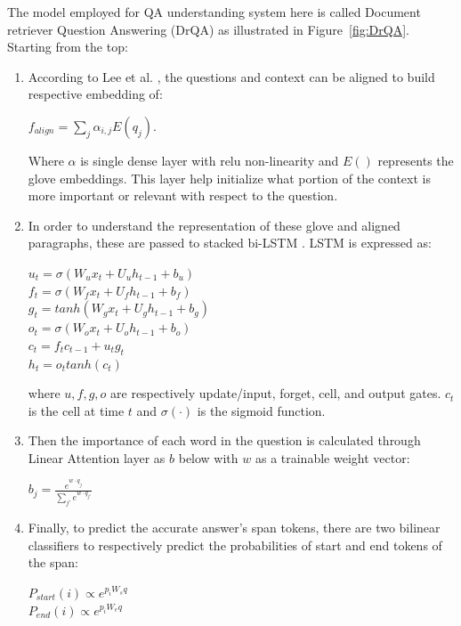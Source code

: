The model employed for QA understanding system here is called Document retriever Question Answering (DrQA) as illustrated in Figure~\ref{fig:DrQA}.  Starting from the top:
\begin{enumerate}[start=1,label={\bfseries\arabic*:}]
    \item According to Lee et al. \cite{Lee}, the questions and context can be aligned to build respective embedding of: 
    \begin{center} $f_{align} = \sum_j \alpha_{i, j} E(q_j)$. \end{center}
    
    Where $\alpha$ is single dense layer with relu non-linearity and $E()$ represents the glove embeddings. This layer help initialize what portion of the context is more important or relevant with respect to the question.
    
    \item In order to understand the representation of these glove and aligned paragraphs, these are passed to stacked bi-LSTM \cite{biLSTM}. LSTM is expressed as: 
    \begin{center}
    $u_t = \sigma(W_u x_t + U_u h_{t-1} + b_u)$ \\
    $f_t = \sigma(W_f x_t + U_f h_{t-1} + b_f)$  \\
    $g_t = tanh(W_g x_t + U_g h_{t-1} + b_g)$  \\
    $o_t = \sigma(W_o x_t + U_o h_{t-1} + b_o)$  \\
    $c_t = f_t c_{t-1} + u_t g_t$ \\
    $h_t = o_t tanh(c_t)$
    \end{center}
    
    where $u, f, g, o$ are  respectively update/input, forget, cell, and output gates. $c_t$ is the cell at time $t$ and $\sigma(\cdot)$ is the sigmoid function. 
    
    \item Then the importance of each word in the question is calculated through Linear Attention layer as $b$ below with $w$ as a trainable weight vector:
    \begin{center} 
    $b_j = \frac{e^{w \cdot q_j}}{\sum_{j'}e^{w\cdot q_{j'}}}$
    \end{center}
    
    \item Finally, to predict the accurate answer's span tokens, there are two bilinear classifiers to respectively predict the probabilities of start and end tokens of the span: 
    \begin{center} 
    $P_{start}(i) \propto e^{p_iW_sq}$ \\
    $P_{end}(i) \propto e^{p_iW_eq}$
    \end{center}
    
    
\end{enumerate}


